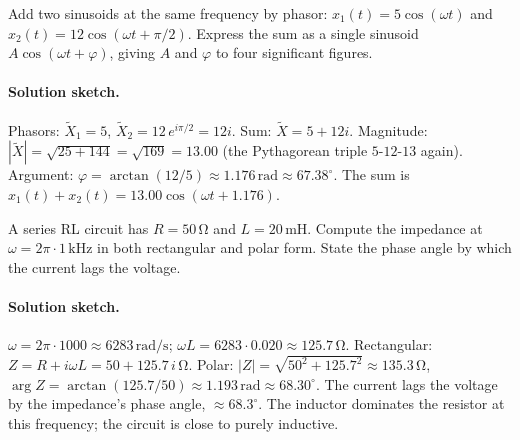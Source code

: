 \begin{exercise}
Add two sinusoids at the same frequency by phasor: $x_{1}(t) =
5\cos(\omega t)$ and $x_{2}(t) = 12\cos(\omega t + \pi/2)$.
Express the sum as a single sinusoid $A\cos(\omega t + \varphi)$,
giving $A$ and $\varphi$ to four significant figures.

\paragraph{Solution sketch.}
Phasors: $\tilde X_{1} = 5$, $\tilde X_{2} = 12\,e^{i\pi/2} =
12i$. Sum: $\tilde X = 5 + 12i$. Magnitude: $|\tilde X| =
\sqrt{25 + 144} = \sqrt{169} = 13.00$ (the Pythagorean triple
$5$-$12$-$13$ again). Argument: $\varphi = \arctan(12/5) \approx
1.176\,\text{rad} \approx 67.38^{\circ}$. The sum is
$x_{1}(t) + x_{2}(t) = 13.00\cos(\omega t + 1.176)$.
\end{exercise}

\begin{exercise}
A series RL circuit has $R = 50 \,\si{\ohm}$ and $L = 20 \,\si
{\milli\henry}$. Compute the impedance at $\omega = 2\pi \cdot 1
\,\si{\kilo\hertz}$ in both rectangular and polar form. State
the phase angle by which the current lags the voltage.

\paragraph{Solution sketch.}
$\omega = 2\pi \cdot 1000 \approx 6283\,\si{\radian\per\second}$;
$\omega L = 6283 \cdot 0.020 \approx 125.7\,\si{\ohm}$.
Rectangular: $Z = R + i\omega L = 50 + 125.7\,i\,\si{\ohm}$. Polar:
$|Z| = \sqrt{50^{2} + 125.7^{2}} \approx 135.3\,\si{\ohm}$,
$\arg Z = \arctan(125.7/50) \approx 1.193\,\text{rad} \approx
68.30^{\circ}$. The current lags the voltage by the impedance's
phase angle, $\approx 68.3^{\circ}$. The inductor dominates the
resistor at this frequency; the circuit is close to purely
inductive.
\end{exercise}

